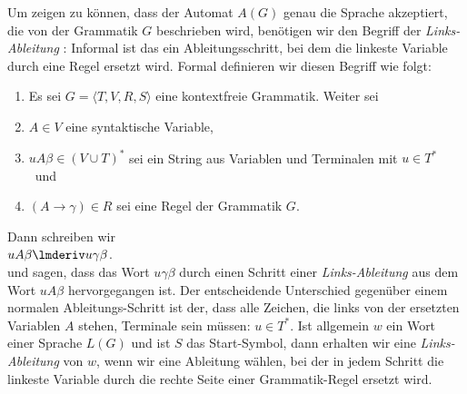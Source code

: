 Um zeigen zu k\"onnen, dass der Automat $A(G)$ genau die Sprache akzeptiert, die von der
Grammatik $G$ beschrieben wird, ben\"otigen wir den Begriff der
\emph{Links-Ableitung} :  Informal ist das ein Ableitungsschritt, bei dem die
linkeste Variable durch eine Regel ersetzt wird.  Formal definieren wir diesen Begriff wie
folgt:  
\begin{enumerate}
\item Es sei $G = \langle T, V, R, S \rangle$ eine kontextfreie Grammatik. Weiter sei 
\item $A \in V$ eine syntaktische Variable,
\item $u A \beta \in (V \cup T)^*$ sei ein String aus Variablen und Terminalen mit $u \in
  T^*$ \ und 
\item $(A \rightarrow \gamma) \in R$ sei eine Regel der Grammatik $G$.
\end{enumerate}
Dann schreiben wir \\[0.2cm]
\hspace*{1.3cm}
$u A \beta \lmderiv u \gamma\beta$. 
\\[0.2cm]
und  sagen, dass das Wort $u\gamma\beta$ durch einen Schritt
einer \emph{Links-Ableitung} aus dem Wort $uA\beta$ hervorgegangen ist.
Der entscheidende Unterschied gegen\"uber einem normalen Ableitungs-Schritt ist der, dass
alle Zeichen, die links von der ersetzten Variablen $A$ stehen, Terminale sein m\"ussen: 
$u \in T^*$.  Ist allgemein $w$ ein Wort einer Sprache $L(G)$ und ist $S$ das
Start-Symbol, dann erhalten wir eine \emph{Links-Ableitung} von $w$, wenn wir eine
Ableitung w\"ahlen, bei der in jedem Schritt die linkeste Variable durch die rechte Seite
einer Grammatik-Regel ersetzt wird.

